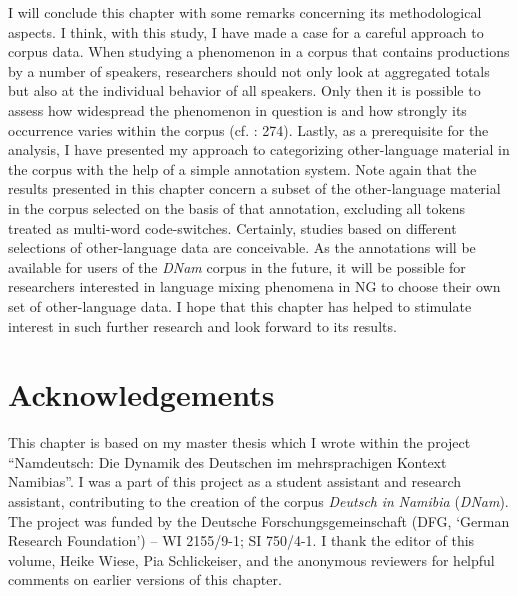 \documentclass[output=paper]{langsci/langscibook}
\begin{document}
I will conclude this chapter with some remarks concerning its methodological aspects. I think, with this study, I have made a case for a careful approach to corpus data. When studying a phenomenon in a corpus that contains productions by a number of speakers, researchers should not only look at aggregated totals but also at the individual behavior of all speakers. Only then it is possible to assess how widespread the phenomenon in question is and how strongly its occurrence varies within the corpus (cf. \citealt{gries_useful_2010}: 274). Lastly, as a prerequisite for the analysis, I have presented my approach to categorizing other-language material in the corpus with the help of a simple annotation system. Note again that the results presented in this chapter concern a subset of the other-language material in the corpus selected on the basis of that annotation, excluding all tokens treated as multi-word code-switches. Certainly, studies based on different selections of other-language data are conceivable. As the annotations will be available for users of the \textit{DNam} corpus in the future, it will be possible for researchers interested in language mixing phenomena in NG to choose their own set of other-language data. I hope that this chapter has helped to stimulate interest in such further research and look forward to its results.

\section*{Acknowledgements}
This chapter is based on my master thesis which I wrote within the project “Namdeutsch: Die Dynamik des Deutschen im mehrsprachigen Kontext Namibias”. I was a part of this project as a student assistant and research assistant, contributing to the creation of the corpus \textit{Deutsch} \textit{in} \textit{Namibia} (\textit{DNam}). The project was funded by the Deutsche Forschungsgemeinschaft (DFG, ‘German Research Foundation’) – WI 2155/9-1; SI 750/4-1. I thank the editor of this volume, Heike Wiese, Pia Schlickeiser, and the anonymous reviewers for helpful comments on earlier versions of this chapter.

{\sloppy\printbibliography[heading=subbibliography,notkeyword=this]}
\end{document}
